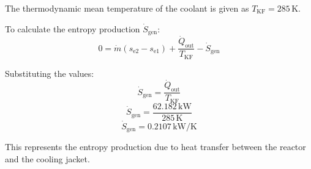 The thermodynamic mean temperature of the coolant is given as \( T_{\text{KF}} = 285 \, \text{K} \).  

To calculate the entropy production \( \dot{S}_{\text{gen}} \):  
\[
0 = \dot{m} (s_{\text{e2}} - s_{\text{e1}}) + \frac{\dot{Q}_{\text{out}}}{T_{\text{KF}}} - \dot{S}_{\text{gen}}
\]  

Substituting the values:  
\[
\dot{S}_{\text{gen}} = \frac{\dot{Q}_{\text{out}}}{T_{\text{KF}}}
\]  
\[
\dot{S}_{\text{gen}} = \frac{62.182 \, \text{kW}}{285 \, \text{K}}
\]  
\[
\dot{S}_{\text{gen}} = 0.2107 \, \text{kW/K}
\]  

This represents the entropy production due to heat transfer between the reactor and the cooling jacket.